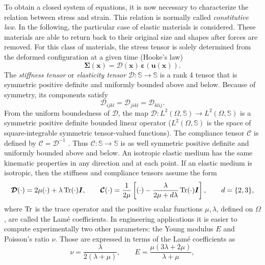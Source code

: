 To obtain a closed system of equations, it is now necessary to characterize the relation between stress and strain. This relation is normally called \textit{constitutive law}. In the following, the particular case of elastic materials is considered. These materials are able to return back to their original size and shapes after forces are removed. For this class of materials, the stress tensor is solely determined from the deformed configuration at a given time (Hooke's law)
\begin{equation*}
\bm{\Sigma}(\bm{x}) = \bm{\mathcal{D}}(\bm{x}) \, \bm{\varepsilon}(\bm{u}(\bm{x})).
\end{equation*}
The \textit{stiffness tensor} or \textit{elasticity tensor} $\bm{\mathcal{D}} : \mathbb{S} \rightarrow \mathbb{S}$ is a rank 4 tensor that is symmetric positive definite and uniformly bounded above and below. Because of symmetry, its components satisfy
\begin{equation*}
\mathcal{D}_{ijkl} = \mathcal{D}_{jikl} = \mathcal{D}_{klij}.
\end{equation*}
From the uniform boundedness of $\bm{\mathcal{D}}$, the map
$\bm{\mathcal{D}}: L^2 (\Omega, \mathbb{S}) \rightarrow L^2 (\Omega, \mathbb{S})$ is a symmetric positive definite bounded linear operator ($L^2 (\Omega, \mathbb{S})$ is the space of square-integrable symmetric tensor-valued functions). The compliance tensor $\bm{\mathcal{C}}$ is defined by $\bm{\mathcal{C}} = \bm{\mathcal{D}}^{-1}$ . Thus $\bm{\mathcal{C}} : \mathbb{S} \rightarrow \mathbb{S}$ is as well symmetric positive definite and uniformly bounded above and below. An isotropic
elastic medium has the same kinematic properties in any direction and at each point. If an elastic medium is isotropic, then the stiffness and compliance tensors assume the form
\begin{equation}
\bm{\mathcal{D}}(\cdot) = 2\mu (\cdot) + \lambda \operatorname{Tr}(\cdot)\bm{I}, \qquad \bm{\mathcal{C}}(\cdot) = \frac{1}{2\mu}\left[(\cdot) - \frac{\lambda}{2\mu + d\lambda}\operatorname{Tr}(\cdot)\bm{I}\right], \qquad d= \{2,3\},
\end{equation}
where  $\operatorname{Tr}$ is the trace operator and the positive scalar functions $\mu, \lambda$, defined on $\Omega$, are called the Lam\'e coefficients. In engineering applications it is easier to compute experimentally two other parameters: the Young modulus $E$ and  Poisson's ratio $\nu$. Those are expressed in terms of the Lam\'e  coefficients as 
\begin{equation}
\nu =\frac{\lambda}{2(\lambda +\mu)}, \qquad 
E=\frac{\mu (3\lambda +2\mu)}{\lambda +\mu},
\end{equation}
